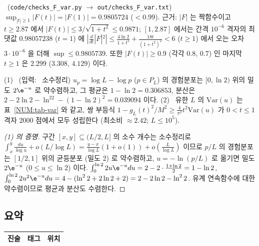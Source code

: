 \begin{proposition}\label{NUM:prop-F}
\NUMERIC\ (\texttt{code/checks\_F\_var.py} $\to$ \texttt{out/checks\_F\_var.txt})
$\sup_{|t|\ge1}|F(t)|=|F(1)|=0.9805724$ ($<0.99$). 근거: $|F|$ 는 짝함수이고 $t\ge2.87$ 에서 $|F(t)|\le3/\sqrt{1+t^2}\le0.9871$;
$[1,2.87]$ 에서는 간격 $10^{-6}$ 격자의 최댓값 $0.98057238$ ($t=1$) 에
$|\frac{d}{dt}|F|^2|\le\frac{4\ln2}{1+t^2}+\frac{18t}{(1+t^2)^2}<6$ ($t\ge1$) 에서 오는 오차 $3\cdot10^{-6}$ 을 더해 $\sup\le0.9805739$.
또한 $|F(t)|\ge0.9$ (각각 $0.8$, $0.7$) 인 마지막 $t\ge1$ 은 $2.299$ ($3.308$, $4.129$) 이다.
\end{proposition}

\begin{proposition}\label{NUM:prop-var}
(1) \PROVED\ (입력: \EXT\ 소수정리) $u_p=\log L-\log p$ ($p\in P_L$) 의 경험분포는 $[0,\ln2)$ 위의 밀도 $2\e^{-u}$ 로 약수렴하고,
그 평균은 $1-\ln2=0.306853$, 분산은 $2-2\ln2-\ln^22-(1-\ln2)^2=0.039094$ 이다.
(2) \NUMERIC\ 유한 $L$ 의 $\mathrm{Var}(u)$ 는 표~\ref{NUM:tab-var} 와 같고, 쌍 부등식
$1-g_L(t)^2/M^2\ge\frac{4}{\pi^2}t^2\mathrm{Var}(u)$ 가 $0<t\le1$ 격자 $2000$ 점에서 모두 성립한다 (최소비 $\approx2.42$; $L\le10^5$).
\end{proposition}
\begin{proof}[(1) 의 증명]
구간 $[x,y]\subseteq(L/2,L]$ 의 소수 개수는 소수정리로 $\int_x^y\frac{du}{\log u}+o(L/\log L)=\frac{y-x}{\log L}(1+o(1))+o(\frac L{\log L})$ 이므로
$p/L$ 의 경험분포는 $[1/2,1]$ 위의 균등분포 (밀도 2) 로 약수렴하고, $u=-\ln(p/L)$ 로 옮기면 밀도 $2\e^{-u}$ ($0\le u\le\ln2$) 이다.
$\int_0^{\ln2}2u\e^{-u}du=2-2\cdot\frac{1+\ln2}{2}=1-\ln2$, $\int_0^{\ln2}2u^2\e^{-u}du=4-(\ln^22+2\ln2+2)=2-2\ln2-\ln^22$.
유계 연속함수에 대한 약수렴이므로 평균과 분산도 수렴한다.
\end{proof}

\begin{table}[ht]\centering\small
\caption{$u_p=\log L-\log p$ 의 평균·분산과 $g_L(1)/M$. 극한값: 평균 $0.306853$, 분산 $0.039094$, $|F(1)|=0.980572$. \NUMERIC\ (\texttt{data/var\_u.csv})}\label{NUM:tab-var}
\end{table}

\subsection{요약}\label{NUM:ssec-summary}
\begin{center}\small
\begin{longtable}{p{}p{}p{}}
\toprule
진술 & 태그 & 위치\\
\midrule
\bottomrule
\end{longtable}
\end{center}
